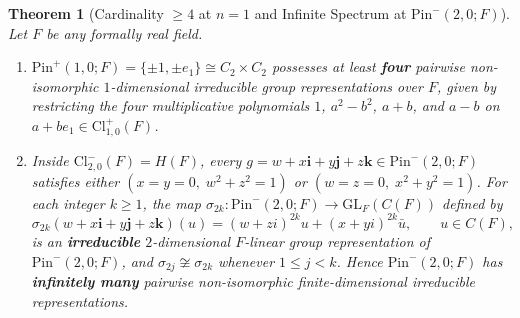 \documentclass[11pt,a4paper]{article}
\theoremstyle{plain}
\newtheorem{theorem}{Theorem}[section]
\theoremstyle{definition}
\newcommand{\Cl}{\mathrm{Cl}}
\newcommand{\Pin}{\mathrm{Pin}}
\begin{document}
\begin{theorem}[Cardinality $\ge 4$ at $n=1$ and Infinite Spectrum at $\Pin^-(2,0; F)$]
\label{thm:infinite-pin2}
Let $F$ be any formally real field.
\begin{enumerate}
\item[(i)] $\Pin^+(1,0; F) = \{\pm 1, \pm e_1\} \cong C_2 \times C_2$ possesses at least \textbf{four} pairwise non-isomorphic $1$-dimensional irreducible group representations over $F$, given by restricting the four multiplicative polynomials $1$, $a^2 - b^2$, $a + b$, and $a - b$ on $a + b e_1 \in \Cl_{1,0}^+(F)$.
\item[(ii)] Inside $\Cl_{2,0}^-(F) = H(F)$, every $g = w + x\mathbf{i} + y\mathbf{j} + z\mathbf{k} \in \Pin^-(2,0; F)$ satisfies either $(x = y = 0,\; w^2 + z^2 = 1)$ or $(w = z = 0,\; x^2 + y^2 = 1)$. For each integer $k \ge 1$, the map $\sigma_{2k} : \Pin^-(2,0; F) \to \mathrm{GL}_F(C(F))$ defined by
\begin{equation}\label{eq:harmonic-rep}
  \sigma_{2k}(w + x\mathbf{i} + y\mathbf{j} + z\mathbf{k})(u) = (w + z i)^{2k} u + (x + y i)^{2k} \bar{u}, \qquad u \in C(F),
\end{equation}
is an \textbf{irreducible} $2$-dimensional $F$-linear group representation of $\Pin^-(2,0; F)$, and $\sigma_{2j} \not\cong \sigma_{2k}$ whenever $1 \le j < k$. Hence $\Pin^-(2,0; F)$ has \textbf{infinitely many} pairwise non-isomorphic finite-dimensional irreducible representations.
\end{enumerate}
\end{theorem}
\end{document}
